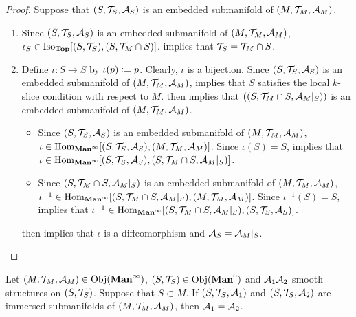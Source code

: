 \documentclass{book}
\begin{document}
	\begin{proof}
		Suppose that $(S, \mathcal{T}_S, \mathcal{A}_S)$ is an embedded submanifold of $(M, \mathcal{T}_M, \mathcal{A}_M)$. 
		\begin{enumerate}
			\item Since $(S, \mathcal{T}_S, \mathcal{A}_S)$ is an embedded submanifold of $(M, \mathcal{T}_M, \mathcal{A}_M)$, $\iota_S \in \operatorname{Iso}_{\operatorname*{\text{\textbf{Top}}}}[(S, \mathcal{T}_S), (S, \mathcal{T}_M \cap S)]$.  implies that $\mathcal{T}_S = \mathcal{T}_M \cap S$. 
			\item Define $\iota:S \rightarrow S$ by $\iota(p) \vcentcolon= p$. Clearly, $\iota$ is a bijection. Since $(S, \mathcal{T}_S, \mathcal{A}_S)$ is an embedded submanifold of $(M, \mathcal{T}_M, \mathcal{A}_M)$, \rex{}  implies that $S$ satisfies the local $k$-slice condition with respect to $M$.    then implies that $((S, \mathcal{T}_M \cap S, \mathcal{A}_M|_S))$ is an embedded submanifold of $(M, \mathcal{T}_M, \mathcal{A}_M)$.
			\begin{itemize}
				\item Since $(S, \mathcal{T}_S, \mathcal{A}_S)$ is an embedded submanifold of $(M, \mathcal{T}_M, \mathcal{A}_M)$, $\iota \in \operatorname{Hom}_{\operatorname*{\text{\textbf{Man}}^{\infty}}}[(S, \mathcal{T}_S, \mathcal{A}_S), (M, \mathcal{T}_M, \mathcal{A}_M)]$. Since $\iota(S) = S$, \rex{}  implies that $\iota \in \operatorname{Hom}_{\operatorname*{\text{\textbf{Man}}^{\infty}}}[(S, \mathcal{T}_S, \mathcal{A}_S), (S, \mathcal{T}_M \cap S, \mathcal{A}_M|_S)]$. 
				\item Since $(S, \mathcal{T}_M \cap S, \mathcal{A}_M|_S)$ is an embedded submanifold of $(M, \mathcal{T}_M, \mathcal{A}_M)$, $\iota^{-1} \in \operatorname{Hom}_{\operatorname*{\text{\textbf{Man}}^{\infty}}}[(S, \mathcal{T}_M \cap S, \mathcal{A}_M|_S), (M, \mathcal{T}_M, \mathcal{A}_M)]$. Since $\iota^{-1}(S) = S$, \rex{}  implies that $\iota^{-1} \in \operatorname{Hom}_{\operatorname*{\text{\textbf{Man}}^{\infty}}}[(S, \mathcal{T}_M \cap S, \mathcal{A}_M|_S), (S, \mathcal{T}_S, \mathcal{A}_S)]$. 
			\end{itemize}
			 then implies that $\iota$ is a diffeomorphism and $\mathcal{A}_S = \mathcal{A}_M|_S$. 
		\end{enumerate}
	\end{proof}

	\begin{ex} 
		Let $(M, \mathcal{T}_M, \mathcal{A}_M) \in \operatorname{Obj}(\operatorname*{\text{\textbf{Man}}^{\infty}})$, $(S, \MT_S) \in \Obj(\Man0)$ and $\mathcal{A}_1 \mathcal{A}_2$ smooth structures on $(S, \mathcal{T}_S)$. Suppose that $S \subset M$. If $(S, \mathcal{T}_S, \mathcal{A}_1)$ and $(S, \mathcal{T}_S, \mathcal{A}_2)$ are immersed submanifolds of $(M, \mathcal{T}_M, \mathcal{A}_M)$, then $\mathcal{A}_1 = \mathcal{A}_2$. 
	\end{ex}
	
\end{document}
